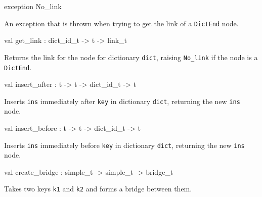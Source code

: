 \documentclass[11pt]{article}
\begin{document}
\label{exception:Key.No-underscorelink}\begin{ocamldoccode}
exception No_link
\end{ocamldoccode}
\begin{ocamldocdescription}
An exception that is thrown when trying to get the link of a
    {\tt{DictEnd}} node.


\end{ocamldocdescription}




\label{val:Key.get-underscorelink}\begin{ocamldoccode}
val get_link : dict_id_t -> t -> link_t
\end{ocamldoccode}
\begin{ocamldocdescription}
Returns the link for the node for dictionary {\tt{dict}}, raising {\tt{No\_link}}
    if the node is a {\tt{DictEnd}}.


\end{ocamldocdescription}




\label{val:Key.insert-underscoreafter}\begin{ocamldoccode}
val insert_after : t -> t -> dict_id_t -> t
\end{ocamldoccode}
\begin{ocamldocdescription}
Inserts {\tt{ins}} immediately after {\tt{key}} in dictionary {\tt{dict}}, 
    returning the new {\tt{ins}} node.


\end{ocamldocdescription}




\label{val:Key.insert-underscorebefore}\begin{ocamldoccode}
val insert_before : t -> t -> dict_id_t -> t
\end{ocamldoccode}
\begin{ocamldocdescription}
Inserts {\tt{ins}} immediately before {\tt{key}} in dictionary {\tt{dict}}, 
    returning the new {\tt{ins}} node.


\end{ocamldocdescription}




\label{val:Key.create-underscorebridge}\begin{ocamldoccode}
val create_bridge : simple_t -> simple_t -> bridge_t
\end{ocamldoccode}
\begin{ocamldocdescription}
Takes two keys {\tt{k1}} and {\tt{k2}} and forms a bridge between them.


\end{ocamldocdescription}
\end{document}
